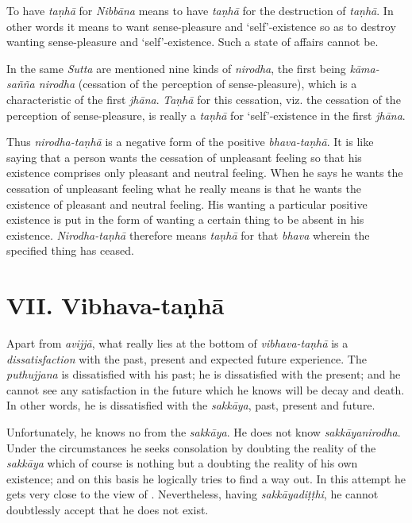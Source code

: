 To have \emph{taṇhā} for \emph{Nibbāna} means to have \emph{taṇhā} for the destruction of \emph{taṇhā}. In other words it means to want sense-pleasure and `self'-existence so as to destroy wanting sense-pleasure and `self'-existence. Such a state of affairs cannot be.

In the same \emph{Sutta} are mentioned nine kinds of \emph{nirodha}, the first being \emph{kāma-sañña nirodha} (cessation of the perception of sense-pleasure), which is a characteristic of the first \emph{jhāna}. \emph{Taṇhā} for this cessation, viz. the cessation of the perception of sense-pleasure, is really a \emph{taṇhā} for `self'-existence in the first \emph{jhāna}.

Thus \emph{nirodha-taṇhā} is a negative form of the positive \emph{bhava-taṇhā}. It is like saying that a person wants the cessation of unpleasant feeling so that his existence comprises only pleasant and neutral feeling. When he says he wants the cessation of unpleasant feeling what he really means is that he wants the existence of pleasant and neutral feeling. His wanting a particular positive existence is put in the form of wanting a certain thing to be absent in his existence. \emph{Nirodha-taṇhā} therefore means \emph{taṇhā} for that \emph{bhava} wherein the specified thing has ceased.

\section{VII. Vibhava-taṇhā}

\label{ch-99-vibhava-tanha}Apart from \emph{avijjā}, what really lies at the bottom of \emph{vibhava-taṇhā} is a \emph{dissatisfaction} with the past, present and expected future experience. The \emph{puthujjana} is dissatisfied with his past; he is dissatisfied with the present; and he cannot see any satisfaction in the future which he knows will be decay and death. In other words, he is dissatisfied with the \emph{sakkāya}, past, present and future.

Unfortunately, he knows no  from the \emph{sakkāya}. He does not know \emph{sakkāyanirodha}. Under the circumstances he seeks consolation by doubting the reality of the \emph{sakkāya} which of course is nothing but a doubting the reality of his own existence; and on this basis he logically tries to find a way out. In this attempt he gets very close to the view of . Nevertheless, having \emph{sakkāyadiṭṭhi}, he cannot doubtlessly accept that he does not exist.

